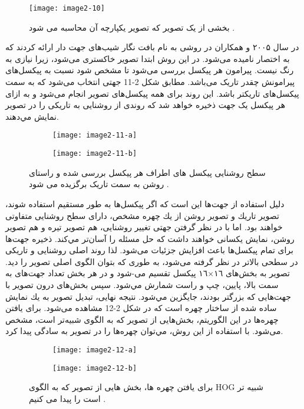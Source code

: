 \begin{figure}[h]
\centering
  \texttt{[image: image2-10]}
  \caption{بخشی از یک تصویر که تصویر یکپارچه آن محاسبه می شود \cite{ref1}.}
  \label{image2-10}
\end{figure}

\noindent
در سال ۲۰۰۵  و همکاران در \cite{1467360} روشی به نام بافت نگار شیب‌های جهت دار  ارائه کردند که به اختصار  نامیده می‌شود. در این روش ابتدا تصویر خاکستری می‌شود، زیرا نیازی به رنگ نیست. پیرامون هر پیکسل بررسی می‌شود تا مشخص شود نسبت به پیکسل‌های پیرامونش چقدر تاریک می‌باشد. مطابق شکل 2-11 جهتی انتخاب می‌شود که به سمت پیکسل‌های تاریکتر باشد. این روند برای همه پیکسل‌های تصوير انجام می‌شود و به ازای هر پیکسل یک جهت ذخیره خواهد شد که روندی از روشنايى به تاريكى را در تصوير نمايش مي‌دهند.

\begin{figure}
\begin{subfigure}{.5\textwidth}
  \centering
  \texttt{[image: image2-11-a]}
  \label{image2-11-a}
\end{subfigure}
\begin{subfigure}{.5\textwidth}
  \centering
  \texttt{[image: image2-11-b]}
  \label{image2-11-b}
\end{subfigure}
 \caption{سطح روشنایی پیکسل های اطراف هر پیکسل بررسی شده و راستای روشن به سمت تاریک برگزیده می شود \cite{ref1}.}
\label{fig:image2-11}
\end{figure}

\noindent
دليل استفاده از جهت‌ها این است که اگر پیکسل‌ها به طور مستقيم استفاده شوند، تصوير تاريك و تصوير روشن از يك چهره مشخص، دارای سطح روشنایی متفاوتى خواهند بود. اما با در نظر گرفتن جهتى تغییر روشنايى، هم تصوير تيره و هم تصوير روشن، نمايش يكسانى خواهند داشت كه حل مسئله را آسان‌تر مي‌كند.
ذخيره جهت‌ها براى تمام پیکسل‌ها باعث افزایش جزئيات می‌شود. لذا روند اصلى روشنايى و تاريكى در سطحی بالاتر در نظر گرفته می‌شود، به طورى كه بتوان الگوى اصلى تصوير را ديد. تصوير به بخش‌هاى ١٦×١٦ پيكسل تقسیم می-شود و در هر بخش تعداد جهت‌هاى به سمت بالا، پايين، چپ و راست شمارش مي‌شود. سپس بخش‌هاى درون تصوير با جهت‌هايى كه بزرگتر بودند، جايگزين مي‌شود. نتيجه نهايى، تبديل تصوير به يك نمايش ساده شده از ساختار چهره است که در شکل 2-12 مشاهده می‌شود. براى يافتن چهره‌ها در این الگوریتم، بخش‌هايى از تصوير كه به الگوى  شبيه‌تر است، مشخص می‌شود. با استفاده از اين روش، مي‌توان چهره‌ها را در تصویر به سادگى پيدا كرد.

\begin{figure}
\begin{subfigure}{.5\textwidth}
  \centering
  \texttt{[image: image2-12-a]}
  \label{image2-12-a}
\end{subfigure}
\begin{subfigure}{.5\textwidth}
  \centering
  \texttt{[image: image2-12-b]}
  \label{image2-12-b}
\end{subfigure}
  \caption{براى يافتن چهره ها، بخش هايى از تصوير كه به الگوى HOG شبيه تر است را پيدا می كنيم \cite{ref1}.}
\label{fig:image2-12}
\end{figure}

